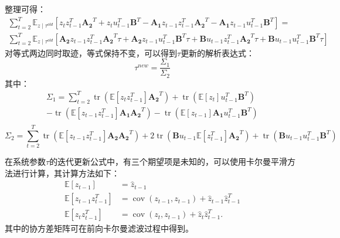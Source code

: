 整理可得：
\begin{equation}
    \begin{gathered}
    \sum_{t=2}^T \mathbb{E}_{z \mid \tau^{old}}\left[z_tz_{t-1}^T\mathbf{A_2}^T + z_tu_{t-1}^T\mathbf{B}^T -\mathbf{A_1}z_{t-1}z_{t-1}^T\mathbf{A_2}^T - \mathbf{A_1}z_{t-1}u_{t-1}^T\mathbf{B}^T\right] = \\ 
    \sum_{t=2}^T \mathbb{E}_{z \mid \tau^{old}}\left[\mathbf{A_2}z_{t-1}z_{t-1}^T\mathbf{A_2}^T\tau +\mathbf{A_2}z_{t-1}u_{t-1}^T\mathbf{B}^T\tau + \mathbf{B}u_{t-1}z_{t-1}^T\mathbf{A_2}^T\tau +\mathbf{B}u_{t-1}u_{t-1}^T\mathbf{B}^T\tau\right]
    \end{gathered}
    \label{eq:4-32}
\end{equation}
对等式两边同时取迹，等式保持不变，可以得到$\tau$更新的解析表达式：
\begin{equation}
    \tau^{new} = \frac{\Sigma_1}{\Sigma_2}
    \label{eq:4-33}
\end{equation}
其中：
\begin{equation}
    \begin{gathered}
    \Sigma_1  = \sum_{t=2}^T \operatorname{tr}\left(\mathbb{E}\left[z_tz_{t-1}^T\right]\mathbf{A_2}^T\right) + \operatorname{tr}\left(\mathbb{E}\left[z_t\right]u_{t-1}^T\mathbf{B}^T\right) \\- \operatorname{tr}\left(\mathbb{E}\left[z_{t-1}z_{t-1}^T\right]\mathbf{A_1}\mathbf{A_2}^T\right) - \operatorname{tr}\left(\mathbb{E}\left[z_{t-1}\right]\mathbf{A_1}u_{t-1}^T\mathbf{B}^T\right) \\
    \end{gathered}
    \label{eq:4-34}
\end{equation}
\begin{equation}
    \Sigma_2  = \sum_{t=2}^T \operatorname{tr}\left(\mathbb{E}\left[z_{t-1}z_{t-1}^T\right]\mathbf{A_2}\mathbf{A_2}^T\right) + 2 \operatorname{tr}\left(\mathbf{B}u_{t-1}\mathbb{E}\left[z_{t-1}^T\right]\mathbf{A_2}^T\right) +\operatorname{tr}\left(\mathbf{B}u_{t-1}u_{t-1}^T\mathbf{B}^T\right)
    \label{eq:4-35}
\end{equation}

在系统参数$\tau$的迭代更新公式中，有三个期望项是未知的，可以使用卡尔曼平滑方法进行计算\cite{bishopPatternRecognitionMachine2006}，其计算方法如下：
\begin{equation}
    \begin{aligned}
    \mathbb{E}\left[z_{t-1}\right] & =\hat{z}_{t-1} \\
    \mathbb{E}\left[z_{t-1} z_{t-1}^T\right] & =\operatorname{cov}\left(z_{t-1}, z_{t-1}\right)+\hat{z}_{t-1} \hat{z}_{t-1}^T \\
    \mathbb{E}\left[z_t z_{t-1}^T\right] & =\operatorname{cov}\left(z_t, z_{t-1}\right)+\hat{z}_t \hat{z}_{t-1}^T .
    \end{aligned}
    \label{eq:4-36}
\end{equation}
其中的协方差矩阵可在前向卡尔曼滤波过程中得到。

